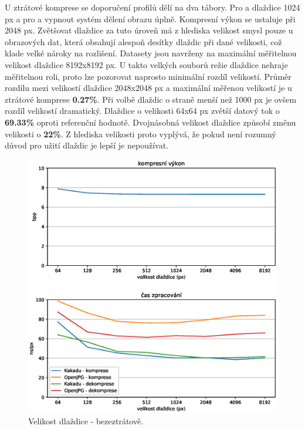 \clearpage

U ztrátové komprese se doporučení profilů dělí na dva tábory. Pro  a  dlaždice 1024 px a pro  a  vypnout systém dělení obrazu úplně. Kompresní výkon se ustaluje při 2048 px. Zvětšovat dlaždice za tuto úroveň má z hlediska velikost smysl pouze u obrazových dat, která obsahují alespoň desítky dlaždic při dané velikosti, což klade velké nároky na rozlišení. Datasety jsou navrženy na maximální měřitelnou velikost dlaždice 8192x8192 px. U takto velkých souborů režie dlaždice nehraje měřitelnou roli, proto lze pozorovat naprosto minimální rozdíl velikostí. Průměr rozdílu mezi velikostí dlaždice 2048x2048 px a maximální měřenou velikostí je u ztrátové komprese \textbf{0.27\%}. Při volbě dlaždic o straně menší než 1000 px je ovšem rozdíl velikostí dramatický. Dlaždice o velikosti 64x64 px zvětší datový tok o \textbf{69.33\%} oproti referenční hodnotě. Dvojnásobná velikost dlaždice způsobí změnu velikosti o \textbf{22\%}. Z hlediska velikosti proto vyplývá, že pokud není rozumný důvod pro užití dlaždic je lepší je nepoužívat. 

\begin{figure}[hbt!]
  \centering
  \hspace*{-0.75cm}
  \includegraphics[width=16cm]{obrazky-figures/tiles/fotky_full_tiles.eps}
  \caption{Velikost dlaždice - bezeztrátově.}
\end{figure}

